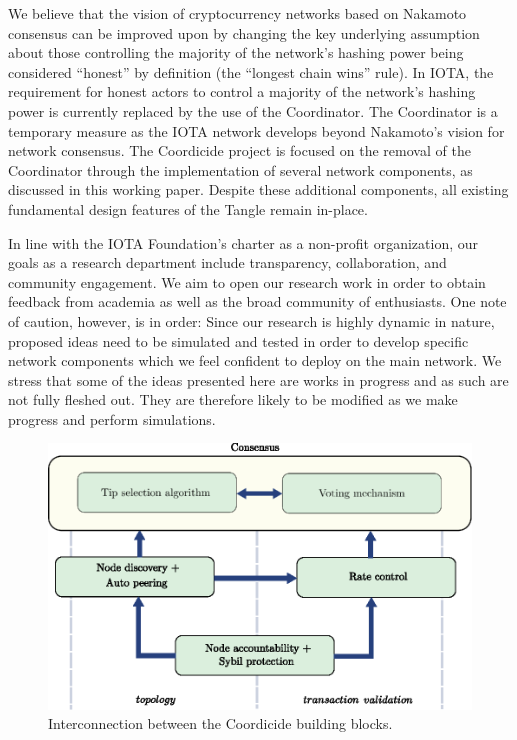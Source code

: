 \documentclass[../main.tex]{subfiles}
\begin{document}
We believe that the vision of cryptocurrency networks based on Nakamoto consensus can be improved upon by changing the key underlying assumption about those controlling the majority of the network's hashing power being considered \enquote{honest} by definition (the ``longest chain wins'' rule). In IOTA, the requirement for honest actors to control a majority of the network's hashing power is currently replaced by the use of the Coordinator. The Coordinator is a temporary measure as the IOTA network develops beyond Nakamoto's vision for network consensus.
The Coordicide project is focused on the removal of the Coordinator through the implementation of several network components, as discussed in this working paper. 
Despite these additional components, all existing fundamental design features of the Tangle remain in-place.

In line with the IOTA Foundation's charter as a non-profit organization, our goals as a research department include transparency, collaboration, and community engagement. We aim to open our research work in order to obtain feedback from academia as well as the broad community of enthusiasts. One note of caution, however, is in order: Since our research is highly dynamic in nature, proposed ideas need to be simulated and tested in order to develop specific network components which we feel confident to deploy on the main network. We stress that some of the ideas presented here are works in progress and as such are not fully fleshed out. They are therefore likely to be modified as we make progress and perform simulations. 

\begin{figure}
     \centering
     \includegraphics[scale=0.8]{images/building-blocks.eps}
     \caption{Interconnection between the Coordicide building blocks.}
     \label{fig:building-blocks}
\end{figure}
\end{document}
